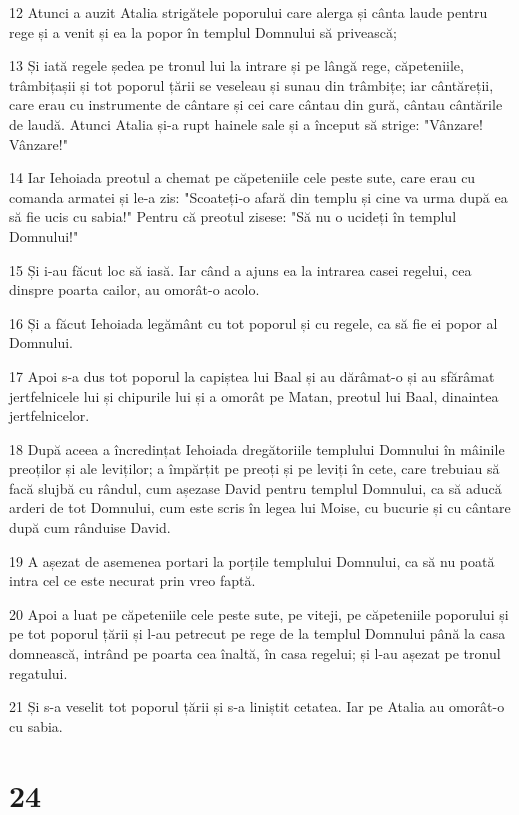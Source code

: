 \par 12 Atunci a auzit Atalia strigătele poporului care alerga și cânta laude pentru rege și a venit și ea la popor în templul Domnului să privească;
\par 13 Și iată regele ședea pe tronul lui la intrare și pe lângă rege, căpeteniile, trâmbițașii și tot poporul țării se veseleau și sunau din trâmbițe; iar cântăreții, care erau cu instrumente de cântare și cei care cântau din gură, cântau cântările de laudă. Atunci Atalia și-a rupt hainele sale și a început să strige: "Vânzare! Vânzare!"
\par 14 Iar Iehoiada preotul a chemat pe căpeteniile cele peste sute, care erau cu comanda armatei și le-a zis: "Scoateți-o afară din templu și cine va urma după ea să fie ucis cu sabia!" Pentru că preotul zisese: "Să nu o ucideți în templul Domnului!"
\par 15 Și i-au făcut loc să iasă. Iar când a ajuns ea la intrarea casei regelui, cea dinspre poarta cailor, au omorât-o acolo.
\par 16 Și a făcut Iehoiada legământ cu tot poporul și cu regele, ca să fie ei popor al Domnului.
\par 17 Apoi s-a dus tot poporul la capiștea lui Baal și au dărâmat-o și au sfărâmat jertfelnicele lui și chipurile lui și a omorât pe Matan, preotul lui Baal, dinaintea jertfelnicelor.
\par 18 După aceea a încredințat Iehoiada dregătoriile templului Domnului în mâinile preoților și ale leviților; a împărțit pe preoți și pe leviți în cete, care trebuiau să facă slujbă cu rândul, cum așezase David pentru templul Domnului, ca să aducă arderi de tot Domnului, cum este scris în legea lui Moise, cu bucurie și cu cântare după cum rânduise David.
\par 19 A așezat de asemenea portari la porțile templului Domnului, ca să nu poată intra cel ce este necurat prin vreo faptă.
\par 20 Apoi a luat pe căpeteniile cele peste sute, pe viteji, pe căpeteniile poporului și pe tot poporul țării și l-au petrecut pe rege de la templul Domnului până la casa domnească, intrând pe poarta cea înaltă, în casa regelui; și l-au așezat pe tronul regatului.
\par 21 Și s-a veselit tot poporul țării și s-a liniștit cetatea. Iar pe Atalia au omorât-o cu sabia.

\chapter{24}

